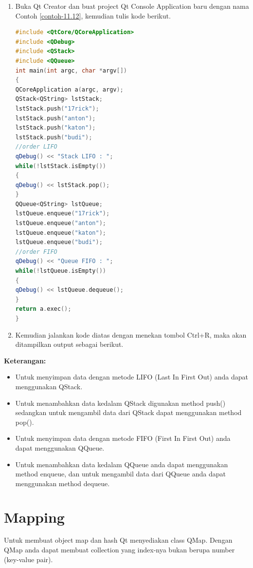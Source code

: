 \begin{enumerate}

\item
  Buka Qt Creator dan buat project Qt Console Application baru dengan
  nama Contoh \ref{contoh-11.12}, kemudian tulis kode berikut.

\begin{lstlisting}[language=c++, caption=Menggunakan Stack dan Queue, label=contoh-11.12]
#include <QtCore/QCoreApplication>
#include <QDebug>
#include <QStack>
#include <QQueue>
int main(int argc, char *argv[])
{
QCoreApplication a(argc, argv);
QStack<QString> lstStack;
lstStack.push("17rick");
lstStack.push("anton");
lstStack.push("katon");
lstStack.push("budi");
//order LIFO
qDebug() << "Stack LIFO : ";
while(!lstStack.isEmpty())
{
qDebug() << lstStack.pop();
}
QQueue<QString> lstQueue;
lstQueue.enqueue("17rick");
lstQueue.enqueue("anton");
lstQueue.enqueue("katon");
lstQueue.enqueue("budi");
//order FIFO
qDebug() << "Queue FIFO : ";
while(!lstQueue.isEmpty())
{
qDebug() << lstQueue.dequeue();
}
return a.exec();
}
\end{lstlisting}
\item
  Kemudian jalankan kode diatas dengan menekan tombol Ctrl+R, maka akan
  ditampilkan output sebagai berikut.
\end{enumerate}

\textbf{Keterangan:}

\begin{itemize}

\item
  Untuk menyimpan data dengan metode LIFO (Last In First Out) anda dapat
  menggunakan QStack.
\item
  Untuk menambahkan data kedalam QStack digunakan method push()
  sedangkan untuk mengambil data dari QStack dapat menggunakan method
  pop().
\item
  Untuk menyimpan data dengan metode FIFO (First In First Out) anda
  dapat menggunakan QQueue.
\item
  Untuk menambahkan data kedalam QQueue anda dapat menggunakan method
  enqueue, dan untuk mengambil data dari QQueue anda dapat menggunakan
  method dequeue.
\end{itemize}

\section{Mapping}\label{mapping}

Untuk membuat object map dan hash Qt menyediakan class QMap. Dengan QMap
anda dapat membuat collection yang index-nya bukan berupa number
(key-value pair).

